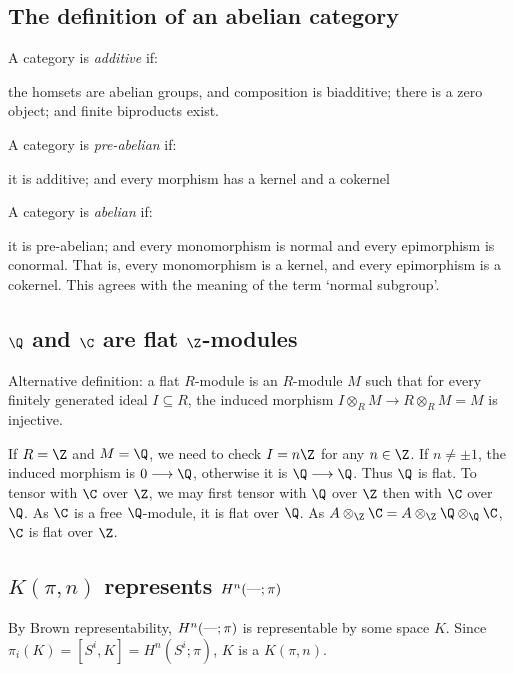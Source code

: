 \documentclass[11pt]{article}
\newcommand{\myheading}[1]
{{\noindent\Large #1}

}
\renewcommand{\myheading}[1]{\subsection{#1}}
\begin{document}
\myheading{The definition of an abelian category}
\noindent A category is \emph{additive} if:
\begin{itemise}
\itm the homsets are abelian groups, and composition is biadditive;
\itm there is a zero object; and
\itm finite biproducts exist.
\end{itemise}
A category is \emph{pre-abelian} if:
\begin{itemise}
\itm it is additive; and
\itm every morphism has a kernel and a cokernel
\end{itemise}
A category is \emph{abelian} if:
\begin{itemise}
\itm it is pre-abelian; and
\itm every monomorphism is normal and every epimorphism is conormal. That is,
every monomorphism is a kernel, and every epimorphism is a cokernel. This agrees
with the meaning of the term `normal subgroup'.
\end{itemise}
\myheading{\texorpdfstring{$\Q$ and $\C$ are flat $\Z$-modules}%
{Q and C are flat Z-modules}}
Alternative definition: a flat $R$-module is an $R$-module $M$ such that for
every finitely generated ideal $I\subseteq R$, the induced morphism $I\otimes_R
M\to R\otimes_R M=M$ is injective.

If $R=\Z$ and $M=\Q$, we need to check $I=n\Z$ for any $n\in\Z$. If $n\neq\pm1$,
the induced morphism is $0\to\Q$, otherwise it is $\Q\to\Q$. Thus $\Q$ is flat.
To tensor with $\C$ over $\Z$, we may first tensor with $\Q$ over $\Z$ then with
$\C$ over $\Q$. As $\C$ is a free $\Q$-module, it is flat over $\Q$. As 
$A\otimes_{\Z}\C=A\otimes_{\Z}\Q\otimes_{\Q}\C$, $\C$ is flat over $\Z$.


\myheading{\texorpdfstring{$K(\pi,n)$ represents $H^n(\textup{---};\pi)$}%
{Eilenberg-MacLane spaces represent ordinary cohomology}}
By Brown representability, $H^n(\textup{---};\pi)$ is representable by some space $K$.
Since $\pi_i(K)=[S^i,K]=H^n(S^i;\pi)$, $K$ is a $K(\pi,n)$.
\end{document}
